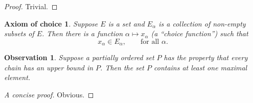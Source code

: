\begin{proof}
  Trivial.
\end{proof}

\newtheorem*{axiomofchoice}{Axiom of choice}
\begin{axiomofchoice}
  Suppose $E$ is a set and ${E_\alpha}$ is a collection of
  non-empty subsets of $E$. Then there is a function $\alpha
  \mapsto x_\alpha$ (a ``choice function'') such that
  \begin{equation}
    x_\alpha \in E_\alpha,\qquad \text{for all }\alpha.
  \end{equation}
\end{axiomofchoice}

\newtheorem{observation}{Observation}
\begin{observation}
  Suppose a partially ordered set $P$ has the property
  that every chain has an upper bound in $P$. Then the
  set $P$ contains at least one maximal element.
\end{observation}
\begin{proof}[A concise proof]
  Obvious.
\end{proof}
